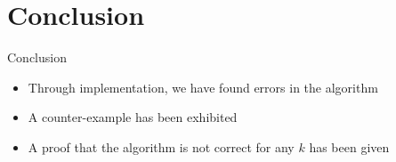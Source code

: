 \section*{Conclusion}
\begin{frame}{Conclusion}
  \begin{itemize}
  \item Through implementation, we have found errors in the algorithm
  \item A counter-example has been exhibited
  \item A proof that the algorithm is not correct for any $k$ has been given
  \end{itemize}
\end{frame}
